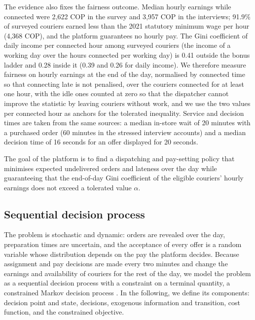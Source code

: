 \documentclass[a4paper,11pt,review,3p,authoryear]{elsarticle}
\begin{document}
The evidence also fixes the fairness outcome. Median hourly earnings while connected were 2{,}622 COP in the survey and 3{,}957 COP in the interviews; 91.9\% of surveyed couriers earned less than the 2021 statutory minimum wage per hour (4{,}368 COP), and the platform guarantees no hourly pay. The Gini coefficient of daily income per connected hour among surveyed couriers (the income of a working day over the hours connected per working day) is 0.41 outside the bonus ladder and 0.28 inside it (0.39 and 0.26 for daily income). We therefore measure fairness on hourly earnings at the end of the day, normalised by connected time so that connecting late is not penalised, over the couriers connected for at least one hour, with the idle ones counted at zero so that the dispatcher cannot improve the statistic by leaving couriers without work, and we use the two values per connected hour as anchors for the tolerated inequality. Service and decision times are taken from the same sources: a median in-store wait of 20 minutes with a purchased order (60 minutes in the stressed interview accounts) and a median decision time of 16 seconds for an offer displayed for 20 seconds.

The goal of the platform is to find a dispatching and pay-setting policy that minimises expected undelivered orders and lateness over the day while guaranteeing that the end-of-day Gini coefficient of the eligible couriers' hourly earnings does not exceed a tolerated value $\alpha$.

\subsection{Sequential decision process}
\label{sec:SDP}

The problem is stochastic and dynamic: orders are revealed over the day, preparation times are uncertain, and the acceptance of every offer is a random variable whose distribution depends on the pay the platform decides. Because assignment and pay decisions are made every two minutes and change the earnings and availability of couriers for the rest of the day, we model the problem as a sequential decision process \citep{powell2021reinforcement,ulmer2020modeling,cuellar2023} with a constraint on a terminal quantity, a constrained Markov decision process \citep{altman1999constrained}. In the following, we define its components: decision point and state, decisions, exogenous information and transition, cost function, and the constrained objective.
\end{document}
